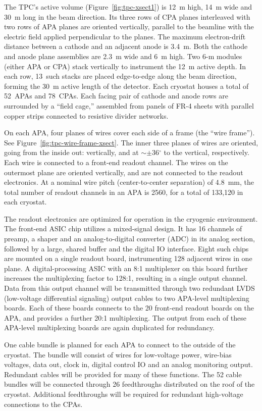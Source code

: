 The TPC's active volume (Figure~\ref{fig:tpc-xsect1}) is 12~m high, 14~m wide and 30~m long in the beam direction. 
Its three rows of CPA planes interleaved with two rows of APA planes 
are oriented vertically, parallel to the beamline with the  
electric field applied perpendicular to the planes.
The maximum electron-drift distance between a cathode and an adjacent 
anode is 3.4~m. Both the cathode and anode plane assemblies are 
2.3~m wide and 6~m high. Two 6-m modules (either APA or CPA)  stack vertically to 
instrument the 12~m active depth. In each row, 13~such stacks are placed 
edge-to-edge 
along the beam direction, forming the 30~m active length of the detector.
Each cryostat houses a total of 52~APAs and 78~CPAs.
Each facing pair of cathode and anode rows are surrounded by a 
``field cage,'' assembled from panels of FR-4 sheets with parallel copper strips connected to resistive divider networks. 

On each APA, four planes of wires cover each side of a frame (the ``wire frame''). See Figure~\ref{fig:tpc-wire-frame-xsect}.
The inner three planes of wires are oriented, going from the inside out: vertically, and at $\sim\pm$36$^\circ$ 
to the vertical, respectively. Each wire is connected to a front-end readout channel.
The wires on the outermost plane are oriented vertically, and are not connected to the readout electronics.
At a nominal wire pitch (center-to-center separation) of 4.8~mm,
the total number of readout channels in an APA is 2560, for a total of 133,120 in each cryostat.
 
The readout electronics are optimized for operation in the cryogenic environment.  
The front-end ASIC chip utilizes a mixed-signal design.  
It has 16 channels of preamp, a shaper and an analog-to-digital converter (ADC) in its analog section,  
followed by a large, shared buffer and the digital IO interface. Eight such chips 
are mounted on a single readout board, instrumenting 128 adjacent wires in one plane. 
A digital-processing ASIC with an 8:1 multiplexer on this board further 
increases the multiplexing factor to 128:1, resulting in a single output channel. Data from this output channel will be transmitted 
through two redundant LVDS (low-voltage differential signaling) output cables to two APA-level multiplexing boards.  Each of these boards connects to the 20 front-end readout boards on the APA, and provides a further 20:1 multiplexing.  The output from each of these APA-level multiplexing boards are again duplicated for redundancy.


One cable bundle is planned for each APA to connect to the outside of the cryostat. The bundle will consist of wires for low-voltage power, wire-bias voltages, data out, clock in, digital control IO and an analog monitoring output. Redundant cables will be provided for many of these functions. The 52 cable bundles will be connected through 26 feedthroughs distributed on the roof of the cryostat. Additional feedthroughs will be required for redundant high-voltage connections to the CPAs. 

